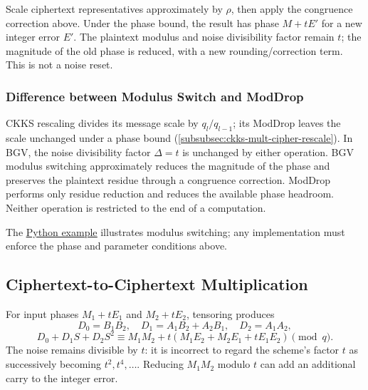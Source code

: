 \begin{tcolorbox}[title={\textbf{\tboxlabel{\ref*{subsec:bgv-modulus-switch}} BGV Modulus Switch}}]
Scale ciphertext representatives approximately by $\rho$, then apply the congruence correction above. Under the phase bound, the result has phase $M+tE'$ for a new integer error $E'$. The plaintext modulus and noise divisibility factor remain $t$; the magnitude of the old phase is reduced, with a new rounding/correction term. This is not a noise reset.
\end{tcolorbox}

\subsubsection{Difference between Modulus Switch and \textsf{ModDrop}}
\label{subsubsec:bgv-moddrop-vs-modswitch}

CKKS rescaling divides its message scale by $q_l/q_{l-1}$; its ModDrop leaves the scale unchanged under a phase bound (\autoref{subsubsec:ckks-mult-cipher-rescale}). In BGV, the noise divisibility factor $\Delta=t$ is unchanged by either operation. BGV modulus switching approximately reduces the magnitude of the phase and preserves the plaintext residue through a congruence correction. ModDrop performs only residue reduction and reduces the available phase headroom. Neither operation is restricted to the end of a computation.

 The \href{https://github.com/wang2000star/fhe-textbook-cn/blob/chinese-edition/source%20code/bgv.py}{\underline{Python example}} illustrates modulus switching; any implementation must enforce the phase and parameter conditions above.


\subsection{Ciphertext-to-Ciphertext Multiplication}
\label{subsec:bgv-mult-cipher}

For input phases $M_1+tE_1$ and $M_2+tE_2$, tensoring produces
\[
D_0=B_1B_2,\quad D_1=A_1B_2+A_2B_1,\quad D_2=A_1A_2,
\]
\[
D_0+D_1S+D_2S^2\equiv M_1M_2+t(M_1E_2+M_2E_1+tE_1E_2)\pmod q.
\]
The noise remains divisible by $t$: it is incorrect to regard the scheme's factor $t$ as successively becoming $t^2,t^4,\ldots$. Reducing $M_1M_2$ modulo $t$ can add an additional carry to the integer error.

